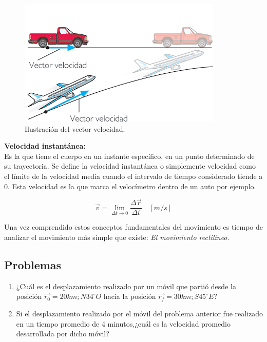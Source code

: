 \documentclass[a5paper,pagesize,10pt,bibtotoc,pointlessnumbers,
normalheadings,DIV=9,fleqn,x11names,table,twoside=false]{scrbook}
\begin{document}
\begin{figure}[ht]
 \centering
 \includegraphics[scale=0.4]{images/vectorvelocidad.png}
 \caption{Ilustración del vector velocidad.}
\end{figure}

\textbf{Velocidad instantánea:}\\

 Es la que tiene el cuerpo en un instante específico, en un punto determinado de su trayectoria. Se define la velocidad 
instantánea o simplemente velocidad como el límite de la velocidad media cuando el intervalo de tiempo considerado tiende a 0. 
Esta velocidad es la que marca el velocímetro dentro de un auto por ejemplo.

 \begin{equation}
 \vec{v}=\lim_{\Delta t \to 0}\frac{\Delta \vec{r}}{\Delta t}\quad [m/s]
 \end{equation}

Una vez comprendido estos conceptos fundamentales del movimiento es tiempo de analizar el movimiento más simple que existe: 
\textit{El movimiento rectilíneo}.

\subsection*{Problemas}

\begin{enumerate}
 \item ¿Cuál es el desplazamiento realizado por un móvil que partió desde la posición $\vec{r_0} = 20 km;N34^\circ O$ hacia la 
posición $\vec{r_f} = 30 km; S45^\circ E$? 

\item Si el desplazamiento realizado por el móvil del problema anterior fue realizado en un tiempo promedio de 4 minutos,¿cuál es 
la velocidad promedio desarrollada por dicho móvil?

\end{enumerate}
\end{document}
